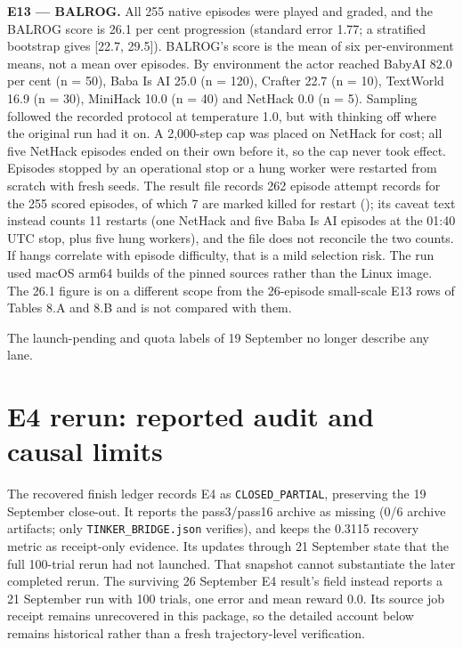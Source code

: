 \documentclass[12pt,a4paper]{report}
\DeclareRobustCommand{\longtok}[1]{\texttt{\seqsplit{#1}}}
\begin{document}
\textbf{E13 --- BALROG.} All 255 native episodes were played and graded,
and the BALROG score is 26.1 per cent progression (standard error 1.77;
a stratified bootstrap gives {[}22.7, 29.5{]}). BALROG's score is the
mean of six per-environment means, not a mean over episodes. By
environment the actor reached BabyAI 82.0 per cent (n = 50), Baba Is AI
25.0 (n = 120), Crafter 22.7 (n = 10), TextWorld 16.9 (n = 30), MiniHack
10.0 (n = 40) and NetHack 0.0 (n = 5). Sampling followed the recorded
protocol at temperature 1.0, but with thinking off where the original
run had it on. A 2,000-step cap was placed on NetHack for cost; all five
NetHack episodes ended on their own before it, so the cap never took
effect. Episodes stopped by an operational stop or a hung worker were
restarted from scratch with fresh seeds. The result file records 262
episode attempt records for the 255 scored episodes, of which 7 are
marked killed for restart (\longtok{n\_killed\_\allowbreak{}for\_\allowbreak{}restart\_\allowbreak{}records});
its caveat text instead counts 11 restarts (one NetHack and five Baba Is
AI episodes at the 01:40 UTC stop, plus five hung workers), and the file
does not reconcile the two counts. If hangs correlate with episode
difficulty, that is a mild selection risk. The run used macOS arm64
builds of the pinned sources rather than the Linux image. The 26.1
figure is on a different scope from the 26-episode small-scale E13 rows
of Tables 8.A and 8.B and is not compared with them.

The launch-pending and quota labels of 19 September no longer describe
any lane.

\section{E4 rerun: reported audit and causal
limits}\label{e4-rerun-reported-audit-and-causal-limits}

The recovered finish ledger records E4 as \texttt{CLOSED\_PARTIAL},
preserving the 19 September close-out. It reports the pass3/pass16
archive as missing (0/6 archive artifacts; only
\texttt{TINKER\_BRIDGE.json} verifies), and keeps the 0.3115 recovery
metric as receipt-only evidence. Its updates through 21 September state
that the full 100-trial rerun had not launched. That snapshot cannot
substantiate the later completed rerun. The surviving 26 September E4
result's \longtok{prior\_\allowbreak{}base\_\allowbreak{}run} field instead reports a 21 September
run with 100 trials, one error and mean reward 0.0. Its source job
receipt remains unrecovered in this package, so the detailed account
below remains historical rather than a fresh trajectory-level
verification.
\end{document}
